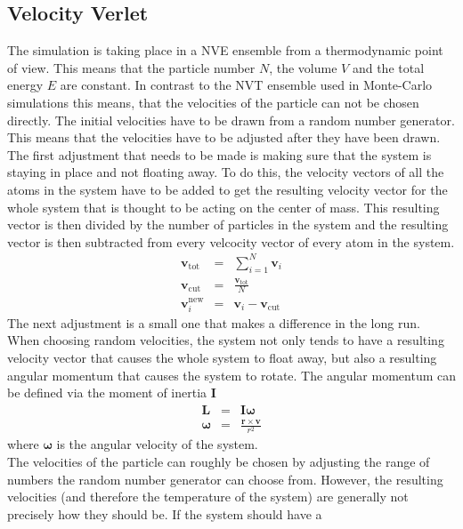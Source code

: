 \documentclass[12pt]{article}
\begin{document}
\subsection{Velocity Verlet}
The simulation is taking place in a NVE ensemble from a thermodynamic point of view. This means that the particle number $N$, the volume $V$ and the
total energy $E$ are constant. In contrast to the NVT ensemble used in Monte-Carlo simulations this means, that the velocities of the particle can not
be chosen directly. The initial velocities have to be drawn from a random number generator. This means that the velocities have to be adjusted after 
they have been drawn.\\
The first adjustment that needs to be made is making sure that the system is staying in place and not floating away. To do this, the velocity vectors
of all the atoms in the system have to be added to get the resulting velocity vector for the whole system that is thought to be acting on the center
of mass. This resulting vector is then divided by the number of particles in the system and the resulting vector is then subtracted from every
velcocity vector of every atom in the system. 
\begin{eqnarray}
    \mathbf{v}_\text{tot} &=& \sum_{i=1}^N \mathbf{v}_i\\
    \mathbf{v}_\text{cut} &=& \frac{\mathbf{v}_\text{tot}}N\\
    \mathbf{v}_i^\text{new} &=& \mathbf{v}_i - \mathbf{v}_\text{cut}
\end{eqnarray}
The next adjustment is a small one that makes a difference in the long run. When choosing random velocities, the system not only tends to have a
resulting velocity vector that causes the whole system to float away, but also a resulting angular momentum that causes the system to rotate.
The angular momentum can be defined via the moment of inertia $\mathbf{I}$
\begin{eqnarray}
    \mathbf{L} &=& \mathbf{I}\boldsymbol{\omega}\\
    \boldsymbol{\omega} &=& \frac{\mathbf{r} \times \mathbf{v}}{r^2}
\end{eqnarray}
where $\boldsymbol{\omega}$ is the angular velocity of the system. 
\\The velocities of the particle can roughly be chosen by adjusting the range of numbers the random number generator can choose from. However, the
resulting velocities (and therefore the temperature of the system) are generally not precisely how they should be. If the system should have a
\end{document}
